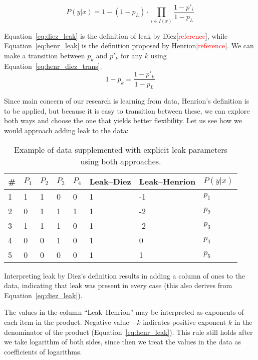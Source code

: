 \begin{equation}
    P(y|x) = 1 - (1 - p_L) \cdot \prod_{i\in I(x)}\frac{1-p'_i}{1-p_L}
    \label{eq:henr_leak}
\end{equation}

Equation~\ref{eq:diez_leak} is the definition of leak by Diez[\textcolor{red}{reference}], while Equation~\ref{eq:henr_leak} is the definition proposed by Henrion[\textcolor{red}{reference}].
We can make a transition between $p_k$ and $p'_k$ for any $k$ using Equation~\ref{eq:henr_diez_trans}.
\begin{equation}
    1-p_k = \frac{1-p'_k}{1-p_L}
    \label{eq:henr_diez_trans}
\end{equation}

Since main concern of our research is learning from data, Henrion's definition is to be applied, but
because it is easy to transition between these, we can explore both ways and choose the one that yields better flexibility.
Let us see how we would approach adding leak to the data:

\begin{table}[h!]
\begin{center}
\begin{tabular}{|l|l|l|l|l|l|l||p{1.5cm}|}
	\hline
	\# & $P_1$ & $P_2$ & $P_3$ & $P_4$ & Leak--Diez & Leak--Henrion & $P(y|x)$ \\\hline
    1 & 1 & 1 & 0 & 0 & 1 & -1 & $p_1$ \\
    2 & 0 & 1 & 1 & 1 & 1 & -2 & $p_2$ \\
    3 & 1 & 1 & 1 & 0 & 1 & -2 & $p_3$ \\
    4 & 0 & 0 & 1 & 0 & 1 & 0 & $p_4$ \\
    5 & 0 & 0 & 0 & 0 & 1 & 1 & $p_5$ \\
    \hline
\end{tabular}
	    \caption{Example of data supplemented with explicit leak parameters using both approaches.}
		\label{tab:bn}
\end{center}
\end{table}

Interpreting leak by Diez's definition results in adding a column of ones to the data, indicating that leak was present in every case (this also derives from Equation~\ref{eq:diez_leak}).

The values in the column ``Leak--Henrion'' may be interpreted as exponents of each item in the product.
Negative value $-k$ indicates positive exponent $k$ in the denominator of the product (Equation~\ref{eq:henr_leak}).
This rule still holds after we take logarithm of both sides, since then we treat the values in the data as coefficients of logarithms.


